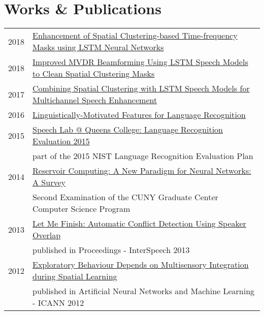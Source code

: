 \documentclass[a4paper,10pt]{article}
\begin{document}
\section{Works \& Publications}
    \vspace{0.2cm}
    \begin{tabular}{rl}
        \textsc{\hspace{2.3cm}2018} & \href{https://grezesf.github.io/papers/2018_ICASSP18__Enhancement_of_Spatial_Clustering_Based_Time_Frequency_Masks_using_LSTM_Neural_Networks.pdf}{Enhancement of Spatial Clustering-based Time-frequency Masks using LSTM Neural Networks}\\

        \textsc{2018} & \href{https://grezesf.github.io/papers/2018_IS18_Improved_MVDR_Beamforming_Using_LSTM_Speech_Models_to_Clean_Spatial_Clustering_Masks.pdf}{Improved MVDR Beamforming Using LSTM Speech Models to Clean Spatial Clustering Masks}\\

        \textsc{2017} & \href{https://grezesf.github.io/papers/2017_IS17_Combining_Spatial_Clustering_with_LSTM_Speech_Models_for_Multichannel_Speech_Enhancement.pdf}{Combining Spatial Clustering with LSTM Speech Models for Multichannel Speech Enhancement}\\

        \textsc{2016} & \href{https://grezesf.github.io/papers/2015_LRE15_linguistically-motivated-features.pdf}{Linguistically-Motivated Features for Language Recognition}\\

        \textsc{2015} & \href{https://grezesf.github.io/papers/2015_LRE15.pdf}{Speech Lab @ Queens College: Language Recognition Evaluation 2015} \\
        & part of the 2015 NIST Language Recognition Evaluation Plan\\

        \textsc{2014} & \href{https://grezesf.github.io/papers/2014_09_04_Second_Exam_Survey_Felix_Grezes.pdf}{Reservoir Computing: A New Paradigm for Neural Networks: A Survey}\\
        & Second Examination of the CUNY Graduate Center Computer Science Program\\

        \textsc{2013} & \href{https://grezesf.github.io/papers/2013-03_LetMeFinish.pdf}{Let Me Finish: Automatic Conflict Detection Using Speaker Overlap}\\
        & published in Proceedings - InterSpeech 2013\\

        \textsc{2012} & \href{https://grezesf.github.io/papers/2012-Exploratory_Behaviour_Depends_on_Multisensory_Integration_during_Spatial_Learning.pdf}{Exploratory Behaviour Depends on Multisensory Integration during Spatial Learning}\\
        & published in Artificial Neural Networks and Machine Learning - ICANN 2012
    \end{tabular}\\
\end{document}
